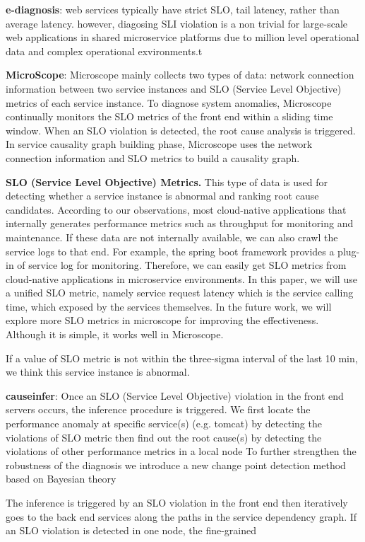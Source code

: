 \textbf{e-diagnosis}: web services typically have strict SLO, tail latency, rather than average latency. however, diagosing SLI violation is a non trivial for large-scale web applications in shared microservice platforms due to million level operational data and complex operational exvironments.t

\textbf{MicroScope}: Microscope mainly collects two types of data: network connection information between two service instances and SLO (Service Level Objective) metrics of each service instance. To diagnose system anomalies, Microscope continually monitors the SLO metrics of the front end within a sliding time window. When an SLO violation is detected, the root cause analysis is triggered. In service causality graph building phase, Microscope uses the network connection information and SLO metrics to build a causality graph. 

\textbf{SLO (Service Level Objective) Metrics.} This type of data is used for detecting whether a service instance is abnormal and ranking root cause candidates. According to our observations, most cloud-native applications that internally generates performance metrics such as throughput for monitoring and maintenance. If these data are not internally available, we can also crawl the service logs to that end. For example, the spring boot framework provides a plug-in of service log for monitoring. Therefore, we can easily get SLO metrics from cloud-native applications in microservice environments. In this paper, we will use a unified SLO metric, namely service request latency which is the service calling time, which exposed by the services themselves. In the future work, we will explore more SLO metrics in microscope for improving the effectiveness. Although it is simple, it works well in Microscope.


If a value of SLO metric is not within the three-sigma interval of the last 10 min, we think this service instance is abnormal.

\textbf{causeinfer}: Once an SLO (Service Level Objective) violation in the front end servers occurs, the inference procedure is triggered. We first locate the performance anomaly at specific service(s) (e.g. tomcat) by detecting the violations of SLO metric then
find out the root cause(s) by detecting the violations of other performance metrics in a local node To further strengthen the robustness of the diagnosis we introduce a new change point detection method based on Bayesian theory

The inference is triggered by an SLO violation in the front end then iteratively goes to the back end services along the paths in the service dependency graph. If an SLO violation is detected in one node, the fine-grained



